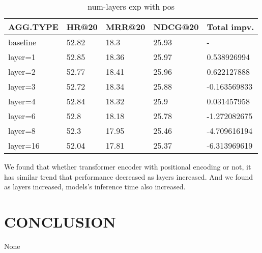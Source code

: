 \documentclass{article}
\begin{document}
\begin{table}
    \caption{num-layers exp with pos}
    \label{num-layers exp with pos}
    \centering
    \begin{tabular}{lllll}
        \toprule
        AGG.TYPE & HR@20 & MRR@20 & NDCG@20 & Total impv.  \\
        \midrule
        baseline & 52.82 & 18.3   & 25.93   & -            \\
        layer=1  & 52.85 & 18.36  & 25.97   & 0.538926994  \\
        layer=2  & 52.77 & 18.41  & 25.96   & 0.622127888  \\
        layer=3  & 52.72 & 18.34  & 25.88   & -0.163569833 \\
        layer=4  & 52.84 & 18.32  & 25.9    & 0.031457958  \\
        layer=6  & 52.8  & 18.18  & 25.78   & -1.272082675 \\
        layer=8  & 52.3  & 17.95  & 25.46   & -4.709616194 \\
        layer=16 & 52.04 & 17.81  & 25.37   & -6.313969619 \\
        \bottomrule
    \end{tabular}
\end{table}

We found that whether transformer encoder with positional encoding or not,
it has similar trend that performance decreased as layers increased.
And we found as layers increased, models's inference time also increased.






\section{CONCLUSION}
None
\vspace{2cm}





\end{document}
